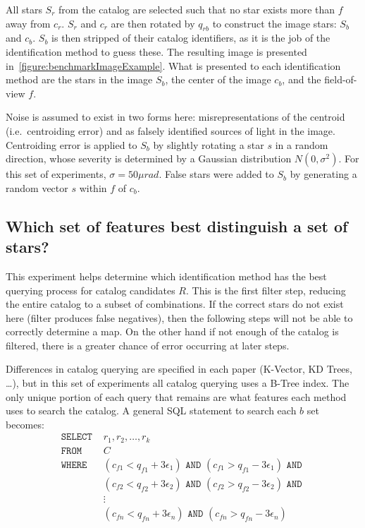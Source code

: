 All stars $S_r$ from the catalog are selected such that no star exists more than $f$ away from $c_r$.
$S_r$ and $c_r$ are then rotated by $q_{rb}$ to construct the image stars: $S_b$ and $c_b$.
$S_b$ is then stripped of their catalog identifiers, as it is the job of the identification method to guess these.
The resulting image is presented in~\autoref{figure:benchmarkImageExample}.
What is presented to each identification method are the stars in the image $S_b$, the center of the image $c_b$, and
the field-of-view $f$.

Noise is assumed to exist in two forms here: misrepresentations of the centroid (i.e.\ centroiding error) and as
falsely identified sources of light in the image.
Centroiding error is applied to $S_b$ by slightly rotating a star $s$ in a random direction, whose severity is
determined by a Gaussian distribution $N(0, \sigma^2)$.
For this set of experiments, $\sigma = 50\mu rad$.
False stars were added to $S_b$ by generating a random vector $s$ within $f$ of $c_b$.

\subsection{Which set of features best distinguish a set of stars?}\label{subsec:featureUniquenessMethods}
This experiment helps determine which identification method has the best querying process for catalog candidates $R$.
This is the first filter step, reducing the entire catalog to a subset of combinations.
If the correct stars do not exist here (filter produces false negatives), then the following steps will not be able to
correctly determine a map.
On the other hand if not enough of the catalog is filtered, there is a greater chance of error occurring at later steps.

Differences in catalog querying are specified in each paper (K-Vector, KD Trees, \ldots), but in this set of
experiments all catalog querying uses a B-Tree index.
The only unique portion of each query that remains are what features each method uses to search the catalog.
A general SQL statement to search each $b$ set becomes:
\begin{align*}
    \texttt{SELECT } &r_1, r_2, \ldots, r_k \\
    \texttt{FROM } &C \\
    \texttt{WHERE } &(c_{f1} < q_{f1} + 3\epsilon_1) \texttt{ AND } (c_{f1} > q_{f1} - 3\epsilon_1) \texttt{ AND } \\
    &(c_{f2} < q_{f2} + 3\epsilon_2) \texttt{ AND } (c_{f2} > q_{f2} - 3\epsilon_2) \texttt{ AND } \\
    &\vdots \\
    &(c_{fn} < q_{fn} + 3\epsilon_n) \texttt{ AND } (c_{fn} > q_{fn} - 3\epsilon_n)
\end{align*}

